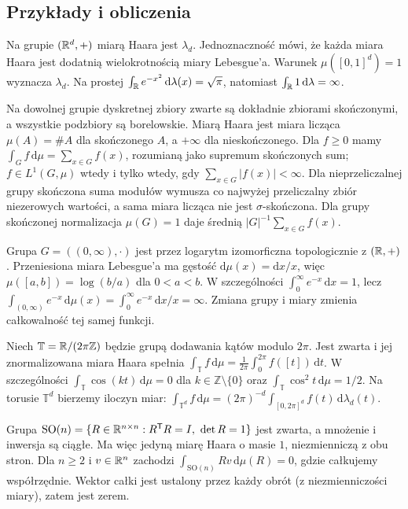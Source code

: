 \subsection*{Przykłady i obliczenia}
\begin{przyklad}
Na grupie $(\mathbb R^d,+)$ miarą Haara jest $\lambda_d$. Jednoznaczność mówi, że każda miara Haara jest dodatnią wielokrotnością miary Lebesgue'a. Warunek $\mu([0,1]^d)=1$ wyznacza $\lambda_d$. Na prostej $\int_\mathbb R e^{-x^2}\,\mathrm d\lambda(x)=\sqrt\pi$, natomiast $\int_\mathbb R1\,\mathrm d\lambda=\infty$.
\end{przyklad}
\begin{przyklad}
Na dowolnej grupie dyskretnej zbiory zwarte są dokładnie zbiorami skończonymi, a wszystkie podzbiory są borelowskie. Miarą Haara jest miara licząca $\mu(A)=\#A$ dla skończonego $A$, a $+\infty$ dla nieskończonego. Dla $f\ge0$ mamy $\int_Gf\,\mathrm d\mu=\sum_{x\in G}f(x)$, rozumianą jako supremum skończonych sum; $f\in L^1(G,\mu)$ wtedy i tylko wtedy, gdy $\sum_{x\in G}|f(x)|<\infty$. Dla nieprzeliczalnej grupy skończona suma modułów wymusza co najwyżej przeliczalny zbiór niezerowych wartości, a sama miara licząca nie jest $\sigma$-skończona. Dla grupy skończonej normalizacja $\mu(G)=1$ daje średnią $|G|^{-1}\sum_{x\in G}f(x)$.
\end{przyklad}
\begin{przyklad}
Grupa $G=((0,\infty),\cdot)$ jest przez logarytm izomorficzna topologicznie z $(\mathbb R,+)$. Przeniesiona miara Lebesgue'a ma gęstość $\mathrm d\mu(x)=\mathrm dx/x$, więc $\mu([a,b])=\log(b/a)$ dla $0<a<b$. W szczególności $\int_0^\infty e^{-x}\,\mathrm dx=1$, lecz $\int_{(0,\infty)}e^{-x}\,\mathrm d\mu(x)=\int_0^\infty e^{-x}\,\mathrm dx/x=\infty$. Zmiana grupy i miary zmienia całkowalność tej samej funkcji.
\end{przyklad}
\begin{przyklad}
Niech $\mathbb T=\mathbb R/(2\pi\mathbb Z)$ będzie grupą dodawania kątów modulo $2\pi$. Jest zwarta i jej znormalizowana miara Haara spełnia
$\int_{\mathbb T}f\,\mathrm d\mu=\frac1{2\pi}\int_0^{2\pi}f([t])\,\mathrm dt$. W szczególności $\int_{\mathbb T}\cos(kt)\,\mathrm d\mu=0$ dla $k\in\mathbb Z\setminus\{0\}$ oraz $\int_{\mathbb T}\cos^2t\,\mathrm d\mu=1/2$. Na torusie $\mathbb T^d$ bierzemy iloczyn miar: $\int_{\mathbb T^d}f\,\mathrm d\mu=(2\pi)^{-d}\int_{[0,2\pi]^d}f(t)\,\mathrm d\lambda_d(t)$.
\end{przyklad}
\begin{przyklad}
Grupa $\mathrm{SO}(n)=\{R\in\mathbb R^{n\times n}:R^{\mathsf T}R=I,\ \det R=1\}$ jest zwarta, a mnożenie i inwersja są ciągłe. Ma więc jedyną miarę Haara o masie $1$, niezmienniczą z obu stron. Dla $n\ge2$ i $v\in\mathbb R^n$ zachodzi $\int_{\mathrm{SO}(n)}Rv\,\mathrm d\mu(R)=0$, gdzie całkujemy współrzędnie. Wektor całki jest ustalony przez każdy obrót (z niezmienniczości miary), zatem jest zerem.
\end{przyklad}

